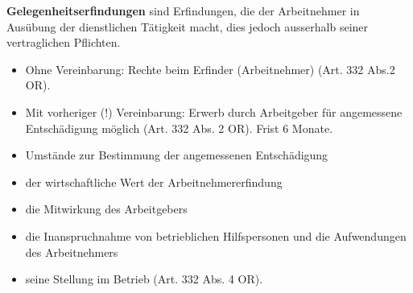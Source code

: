 \textbf{Gelegenheitserfindungen} sind Erfindungen, die der Arbeitnehmer
in Ausübung der dienstlichen Tätigkeit macht, dies jedoch ausserhalb
seiner vertraglichen Pflichten.

\begin{itemize}
\tightlist
\item
  Ohne Vereinbarung: Rechte beim Erfinder (Arbeitnehmer) (Art. 332 Abs.2
  OR).
\item
  Mit vorheriger (!) Vereinbarung: Erwerb durch Arbeitgeber für
  angemessene Entschädigung möglich (Art. 332 Abs. 2 OR). Frist 6
  Monate.
\item
  Umstände zur Bestimmung der angemessenen Entschädigung
\item
  der wirtschaftliche Wert der Arbeitnehmererfindung
\item
  die Mitwirkung des Arbeitgebers
\item
  die Inanspruchnahme von betrieblichen Hilfspersonen und die
  Aufwendungen des Arbeitnehmers
\item
  seine Stellung im Betrieb (Art. 332 Abs. 4 OR).
\end{itemize}
